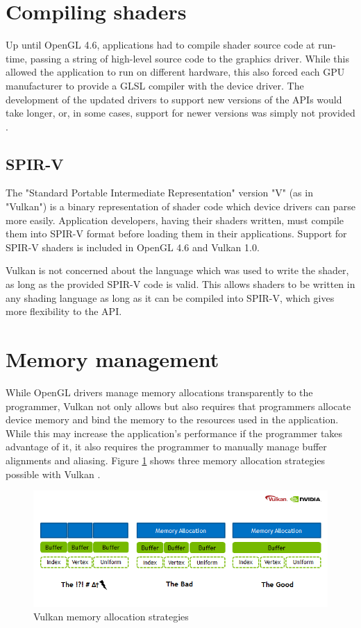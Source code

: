 \section{Compiling shaders}
Up until OpenGL 4.6, applications had to compile shader source code at run-time, passing a string of high-level source code to the graphics driver. While this allowed the application to run on different hardware, this also forced each GPU manufacturer to provide a GLSL compiler with the device driver. The development of the updated drivers to support new versions of the APIs would take longer, or, in some cases, support for newer versions was simply not provided \cite{apple_nopengl}.

\subsection{SPIR-V}
The "Standard Portable Intermediate Representation" version "V" (as in "Vulkan") is a binary representation of shader code which device drivers can parse more easily. Application developers, having their shaders written, must compile them into SPIR-V format before loading them in their applications. Support for SPIR-V shaders is included in OpenGL 4.6 and Vulkan 1.0.

Vulkan is not concerned about the language which was used to write the shader, as long as the provided SPIR-V code is valid. This allows shaders to be written in any shading language as long as it can be compiled into SPIR-V, which gives more flexibility to the API.

\section{Memory management}
While OpenGL drivers manage memory allocations transparently to the programmer, Vulkan not only allows but also requires that programmers allocate device memory and bind the memory to the resources used in the application. While this may increase the application's performance if the programmer takes advantage of it, it also requires the programmer to manually manage buffer alignments and aliasing. Figure \ref{fig:vulkan_mem_alloc} shows three memory allocation strategies possible with Vulkan \cite{vulkan_mem_mgmt}.

\begin{figure}[ht]
    \caption{Vulkan memory allocation strategies}
    \begin{center}
        \includegraphics[width = 15cm]{figs/vulkan_memory_strategy.png}
    \end{center}
    \label{fig:vulkan_mem_alloc}
\end{figure}

